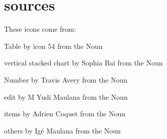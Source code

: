 \chapter{sources}
\hypertarget{md_public_2glpi_2pics_2charts_2sources}{}\label{md_public_2glpi_2pics_2charts_2sources}
These icons come from\+:


\begin{DoxyItemize}
\item Table by icon 54 from the Noun 
\item vertical stacked chart by Sophia Bai from the Noun 
\item Number by Travis Avery from the Noun 
\item edit by M Yudi Maulana from the Noun 
\item items by Adrien Coquet from the Noun 
\item others by Igé Maulana from the Noun  
\end{DoxyItemize}